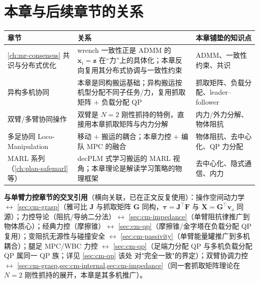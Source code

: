 \section*{本章与后续章节的关系}
\begin{table}[H]\centering\small
\begin{tabular}{p{3.4cm}p{6.4cm}p{3.8cm}}
\toprule
章节 & 关系 & 本章铺垫的知识点 \\
\midrule
\cref{ch:mr-consensus} 共识与分布式优化 & wrench 一致性正是 ADMM 的 $\mathbf{x}_i=\mathbf{z}$ 在“力”上的具体化；本章反向复用其分布式协调与一致性约束 & ADMM、一致性约束、共识 \\
异构多机协同 & 本章是同构搬运基础；异构搬运按机型分配不同子任务/力，复用抓取矩阵 $+$ 负载分配 QP & 抓取矩阵、负载分配、leader--follower \\
双臂/多臂协同操作 & 双臂是 $N{=}2$ 刚性抓持的特例，直接用本章抓取矩阵与内力分解 & 内力/外力分解、物体阻抗 \\
多足协同 Loco-Manipulation & 移动 $+$ 搬运的耦合；本章力控 $+$ 编队 MPC 的融合 & 物体阻抗、去中心化、QP 力分配 \\
MARL 系列（\cref{ch:plan-safemarl} 等） & decPLM 式学习搬运的 MARL 视角；本章理论是解读学习策略的物理框架 & 去中心化、隐式通信、内力 \\
\bottomrule
\end{tabular}
\end{table}

\noindent\textbf{与单臂力控章节的交叉引用}（横向关联，已在正文反复使用）：操作空间动力学 $\leftrightarrow$ \cref{sec:cm-grasp}（雅可比 $\mathbf{J}$ 与抓取矩阵 $\mathbf{G}$ 同构，$\boldsymbol{\tau}=\mathbf{J}^\top\mathbf{F}$ 与 $\dot{\mathbf{X}}=\mathbf{G}^\top\mathbf{v}_o$ 同源）；力控导论（阻抗/导纳二分法）$\leftrightarrow$ \cref{sec:cm-impedance}（单臂阻抗律推广到物体质心）；经典力控（摩擦锥）$\leftrightarrow$ \cref{sec:cm-qp}（摩擦锥/金字塔在负载分配 QP 复用）；变阻抗无源性与碰撞安全 $\leftrightarrow$ \cref{sec:cm-passivity}（单臂能量罐推广到多机耦合）；腿足 MPC/WBC 力控 $\leftrightarrow$ \cref{sec:cm-qp}（足端力分配 QP 与多机负载分配 QP 属同一 QP 族；详见 \cref{sec:cm-qp} 该处 \pz 对"完全一致"的界定）；双臂协调力控 $\leftrightarrow$ \cref{sec:cm-grasp,sec:cm-internal,sec:cm-impedance}（同一套抓取矩阵理论在 $N{=}2$ 刚性抓持的展开，本章是其多机推广）。

